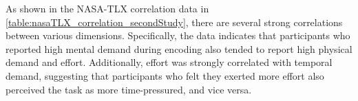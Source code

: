 \begin{table}[ht]
\caption{within NasaTLX tmp.}
\label{table:nasaTLX_correlation_secondStudy}
\end{table}

As shown in the NASA-TLX correlation data in \autoref{table:nasaTLX_correlation_secondStudy}, there are several strong correlations between various dimensions.
Specifically, the data indicates that participants who reported high mental demand during encoding also tended to report high physical demand and effort. Additionally, effort was strongly correlated with temporal demand, suggesting that participants who felt they exerted more effort also perceived the task as more time-pressured, and vice versa.

